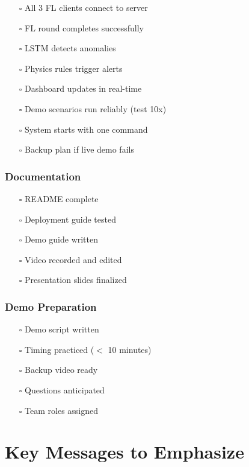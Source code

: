 \documentclass[11pt,a4paper]{article}
\begin{document}
\begin{itemize}[leftmargin=*]
    \item[$\square$] All 3 FL clients connect to server
    \item[$\square$] FL round completes successfully
    \item[$\square$] LSTM detects anomalies
    \item[$\square$] Physics rules trigger alerts
    \item[$\square$] Dashboard updates in real-time
    \item[$\square$] Demo scenarios run reliably (test 10x)
    \item[$\square$] System starts with one command
    \item[$\square$] Backup plan if live demo fails
\end{itemize}

\subsubsection{Documentation}

\begin{itemize}[leftmargin=*]
    \item[$\square$] README complete
    \item[$\square$] Deployment guide tested
    \item[$\square$] Demo guide written
    \item[$\square$] Video recorded and edited
    \item[$\square$] Presentation slides finalized
\end{itemize}

\subsubsection{Demo Preparation}

\begin{itemize}[leftmargin=*]
    \item[$\square$] Demo script written
    \item[$\square$] Timing practiced ($<$ 10 minutes)
    \item[$\square$] Backup video ready
    \item[$\square$] Questions anticipated
    \item[$\square$] Team roles assigned
\end{itemize}


\section{Key Messages to Emphasize}
\end{document}
